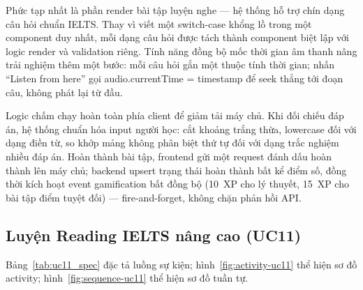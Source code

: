\begin{sloppypar}
Phức tạp nhất là phần render bài tập luyện nghe --- hệ thống hỗ trợ chín dạng câu hỏi chuẩn IELTS. Thay vì viết một switch-case khổng lồ trong một component duy nhất, mỗi dạng câu hỏi được tách thành component biệt lập với logic render và validation riêng. Tính năng đồng bộ mốc thời gian âm thanh nâng trải nghiệm thêm một bước: mỗi câu hỏi gắn một thuộc tính thời gian; nhấn ``Listen from here'' gọi audio.currentTime = timestamp để seek thẳng tới đoạn câu, không phát lại từ đầu.
\end{sloppypar}

\begin{sloppypar}
Logic chấm chạy hoàn toàn phía client để giảm tải máy chủ. Khi đối chiếu đáp án, hệ thống chuẩn hóa input người học: cắt khoảng trắng thừa, lowercase đối với dạng điền từ, so khớp mảng không phân biệt thứ tự đối với dạng trắc nghiệm nhiều đáp án. Hoàn thành bài tập, frontend gửi một request đánh dấu hoàn thành lên máy chủ; backend upsert trạng thái hoàn thành bất kể điểm số, đồng thời kích hoạt event gamification bất đồng bộ (10~XP cho lý thuyết, 15~XP cho bài tập điểm tuyệt đối) --- fire-and-forget, không chặn phản hồi API.
\end{sloppypar}

\subsection{Luyện Reading IELTS nâng cao (UC11)}
Bảng~\ref{tab:uc11_spec} đặc tả luồng sự kiện; hình~\ref{fig:activity-uc11} thể hiện sơ đồ activity; hình~\ref{fig:sequence-uc11} thể hiện sơ đồ tuần tự.
